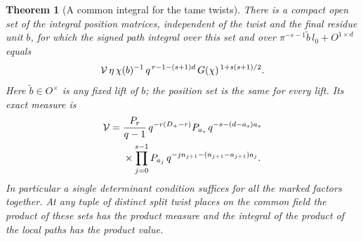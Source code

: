 \documentclass[a4paper,11pt]{article}
\newtheorem{theorem}[proposition]{Theorem}
\theoremstyle{definition}
\theoremstyle{remark}
\numberwithin{equation}{section}
\begin{document}
\begin{theorem}[A common integral for the tame twists]\leavevmode
\label{thm:splitmass323}
There is a compact open set of the integral position
matrices, independent of the twist and the final residue
unit \(b\), for which the signed path integral over this
set and over \(\pi^{-s-1}\widetilde b\,l_0+O^{1\times d}\)
equals
\[
 {\cal V}\,\eta\,\chi(b)^{-1}\,
 q^{\,r-1-(s+1)d}\,G(\chi)^{\,1+s(s+1)/2}.
\]
Here \(\widetilde b\in O^\times\) is any fixed lift of \(b\);
the position set is the same for every lift. Its exact
measure is
\[
 \begin{split}
 {\cal V}={}&
 \frac{P_r}{q-1}\,q^{-r(D_+-r)}
   P_{a_s}\,q^{-s-(d-a_s)a_s}\\
 &{}\times\prod_{j=0}^{s-1}
  P_{a_j}\,q^{-j n_{j+1}-(n_{j+1}-a_{j+1})a_j}.
 \end{split}
\]
In particular a single determinant condition suffices for
all the marked factors together. At any tuple of distinct
split twist places on the common field the product of these
sets has the product measure and the integral of the product
of the local paths has the product value.
\end{theorem}
\end{document}
